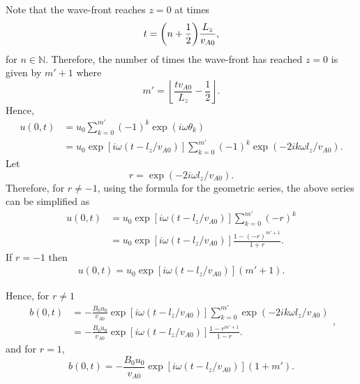 Note that the wave-front reaches $z=0$ at times
\begin{equation}
    t = \qty(n+\frac{1}{2})\frac{L_z}{v_{A0}},
\end{equation}
for $n\in\mathds{N}$. Therefore, the number of times the wave-front has reached $z=0$ is given by $m'+1$ where
\begin{equation}
    m'=\left\lfloor\frac{tv_{A0}}{L_z}-\frac{1}{2}\right\rfloor.
\end{equation}
Hence,
\begin{equation}
    \begin{aligned}
    u(0,t) &= u_0\sum_{k=0}^{m'}(-1)^k\exp(i\omega\theta_k) \\
    &= u_0\exp[i\omega(t - l_z/v_{A0})]\sum_{k=0}^{m'}(-1)^k\exp(-2ik\omega l_z/ v_{A0}).
    \end{aligned}
\end{equation}
Let
\begin{equation}
    r = \exp(-2i\omega l_z/ v_{A0}).
\end{equation}
Therefore, for $r\ne-1$, using the formula for the geometric series, the above series can be simplified as
\begin{equation}
    \label{eq:u0_non_res}
    \begin{aligned}
    u(0,t) &= u_0\exp[i\omega(t - l_z/v_{A0})]\sum_{k=0}^{m'}(-r)^k \\
    &= u_0\exp[i\omega(t - l_z/v_{A0})]\frac{1-(-r)^{m'+1}}{1+r}.
    \end{aligned}   
\end{equation}
If $r=-1$ then 
\begin{equation}
    \label{eq:u0_odd_harmonic}
    \begin{aligned}
    u(0,t) = u_0\exp[i\omega(t - l_z/v_{A0})](m'+1).
    \end{aligned}   
\end{equation}

Hence, for $r\ne1$
\begin{equation}
    \begin{aligned}
    b(0,t)&=-\frac{B_0u_0}{v_{A0}}\exp[i\omega(t - l_z/v_{A0})]\sum_{k=0}^{m'}\exp(-2ik\omega l_z/ v_{A0}) \\
    &=-\frac{B_0u_0}{v_{A0}}\exp[i\omega(t - l_z/v_{A0})]\frac{1-r^{m'+1}}{1-r}.
    \end{aligned},
\end{equation}
and for $r=1$,
\begin{equation}
    \label{eq:b0_even_harmonic}
    b(0,t)=-\frac{B_0u_0}{v_{A0}}\exp[i\omega(t - l_z/v_{A0})](1+m').
\end{equation}

